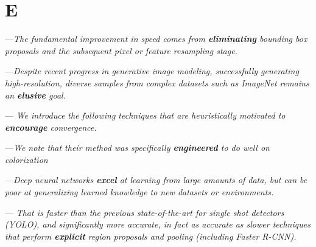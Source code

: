 \section{E}

 ---\textit{The fundamental improvement in
speed comes from \textbf{eliminating}  bounding box proposals and the subsequent pixel or feature resampling stage.}


 ---\textit{Despite recent progress in generative image modeling, successfully generating high-resolution, diverse samples from complex datasets such as ImageNet remains
an \textbf{elusive} goal.}

 --- \textit{We introduce the following techniques that are heuristically motivated to \textbf{encourage} convergence.}

 ---\textit{We note that their method was specifically \textbf{engineered} to do well on colorization}

 ---\textit{Deep neural networks \textbf{excel} at learning from large amounts of data, but can be poor at generalizing learned knowledge to new datasets or environments.}


 ---\textit{
That is faster than
the previous state-of-the-art for single shot detectors (YOLO), and significantly
more accurate, in fact as accurate as slower techniques that perform \textbf{explicit} region
proposals and pooling (including Faster R-CNN).}

